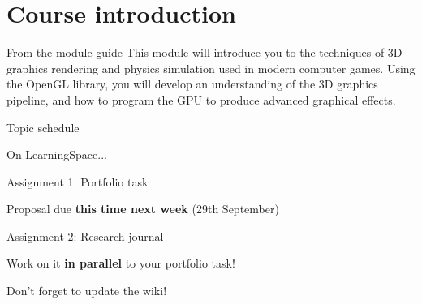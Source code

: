 \part{Course introduction}
\frame{\partpage}

\begin{frame}{From the module guide}
This module will introduce you to the techniques of 3D graphics rendering and physics simulation used in modern computer games. Using the OpenGL library, you will develop an understanding of the 3D graphics pipeline, and how to program the GPU to produce advanced graphical effects.
\end{frame}

\begin{frame}{Topic schedule}
	\begin{center}
		On LearningSpace...
	\end{center}
\end{frame}

\begin{frame}{Assignment 1: Portfolio task}
	\begin{center}
		Proposal due \textbf{this time next week} (29th September)
	\end{center}
\end{frame}

\begin{frame}{Assignment 2: Research journal}
	\begin{center}
		Work on it \textbf{in parallel} to your portfolio task!
		
		\pause Don't forget to update the wiki!
	\end{center}
\end{frame}

